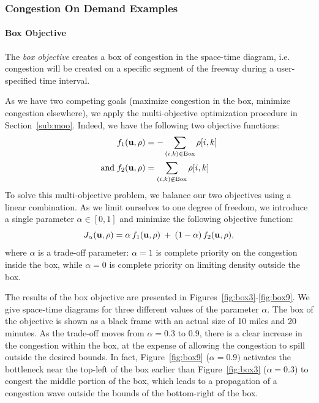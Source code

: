 \subsubsection{Congestion On Demand Examples}

\paragraph{Box Objective}
The \emph{box objective} creates a box of congestion in the space-time diagram, i.e. congestion will be created on a specific segment of the freeway during a user-specified time interval.


As we have two competing goals (maximize congestion in the box, minimize congestion elsewhere), we apply the multi-objective optimization procedure in Section~\ref{sub:moo}. Indeed, we have the following two objective functions:
\begin{align}
	f_1 \left( \vectorize{u}, \vectorize{\rho} \right) & = - \sum_{(i,k) \in \text{Box}} \rho\left[i,k\right] \\ 
	\text{and} \; f_2 \left( \vectorize{u}, \vectorize{\rho} \right) & =  \sum_{(i,k) \not \in \text{Box}} \rho\left[i,k\right]
\end{align}
To solve this multi-objective problem, we balance our two objectives using a linear combination. As we limit ourselves to one degree of freedom, we introduce a single parameter $\alpha \in \left[0,1\right]$ and minimize the following objective function:
\begin{equation}
\label{eqn:alpha}
J_{\alpha} \left( \vectorize{u}, \vectorize{\rho} \right) = \alpha \, f_1 \left( \vectorize{u}, \vectorize{\rho} \right) \: + \: \left(1 - \alpha \right) \, f_2 \left( \vectorize{u}, \vectorize{\rho} \right),
\end{equation}
where $\alpha$ is a trade-off parameter: $\alpha = 1$ is complete priority on the congestion inside the box, while $\alpha = 0$ is complete priority on limiting density outside the box.


The results of the box objective are presented in Figures~\ref{fig:box3}-\ref{fig:box9}. We give space-time diagrams for three different values of the parameter $\alpha$. The box of the objective is shown as a black frame with an actual size of 10 miles and 20 minutes. As the trade-off moves from $\alpha=0.3$ to $0.9$, there is a clear increase in the congestion within the box, at the expense of allowing the congestion to spill outside the desired bounds. In fact, Figure~\ref{fig:box9} ($\alpha=0.9)$ activates the bottleneck near the top-left of the box earlier than Figure~\ref{fig:box3} ($\alpha=0.3$) to congest the middle portion of the box, which leads to a propagation of a congestion wave outside the bounds of the bottom-right of the box.

